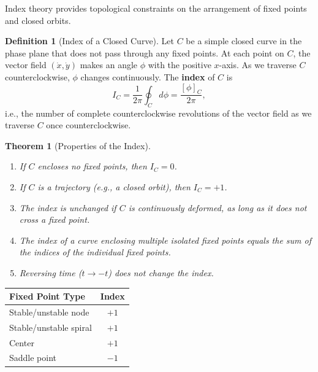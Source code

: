 \documentclass[11pt,letterpaper]{article}
\theoremstyle{definition}
\newtheorem{definition}{Definition}[section]
\theoremstyle{plain}
\newtheorem{theorem}{Theorem}[section]
\theoremstyle{remark}
\begin{document}
Index theory provides topological constraints on the arrangement of fixed
points and closed orbits.

\begin{definition}[Index of a Closed Curve]
Let $C$ be a simple closed curve in the phase plane that does not pass
through any fixed points.  At each point on $C$, the vector field
$(\dot{x},\dot{y})$ makes an angle $\phi$ with the positive $x$-axis.
As we traverse $C$ counterclockwise, $\phi$ changes continuously.  The
\textbf{index} of $C$ is
\begin{equation}
  I_C = \frac{1}{2\pi}\oint_C d\phi = \frac{[\phi]_C}{2\pi},
\end{equation}
i.e., the number of complete counterclockwise revolutions of the vector
field as we traverse $C$ once counterclockwise.
\end{definition}

\begin{theorem}[Properties of the Index]
\begin{enumerate}[leftmargin=2em]
\item If $C$ encloses no fixed points, then $I_C = 0$.
\item If $C$ is a trajectory (e.g., a closed orbit), then $I_C = +1$.
\item The index is unchanged if $C$ is continuously deformed, as long as
      it does not cross a fixed point.
\item The index of a curve enclosing multiple isolated fixed points equals
      the sum of the indices of the individual fixed points.
\item Reversing time ($t\to -t$) does not change the index.
\end{enumerate}
\end{theorem}

\begin{keyresult}
\begin{center}
\begin{tabular}{@{}lc@{}}
\toprule
\textbf{Fixed Point Type} & \textbf{Index} \\
\midrule
Stable/unstable node    & $+1$ \\
Stable/unstable spiral  & $+1$ \\
Center                  & $+1$ \\
Saddle point            & $-1$ \\
\bottomrule
\end{tabular}
\end{center}
\end{keyresult}
\end{document}

